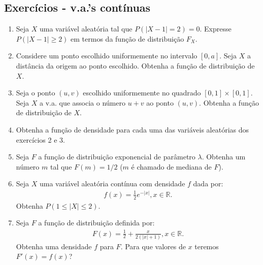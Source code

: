 \documentclass[../Notas.tex]{subfiles}
\begin{document}
\subsection{Exercícios - v.a.'s contínuas}

\begin{enumerate}
    \item Seja $X$ uma variável aleatória tal que $P(|X - 1| = 2) = 0$. Expresse $P(|X - 1| \geq 2)$ em termos da função de distribuição $F_X$.
    \item Considere um ponto escolhido uniformemente no intervalo $[0, a]$. Seja $X$ a distância da origem ao ponto escolhido. Obtenha a função de distribuição de $X$.
    \item Seja o ponto $(u, v)$ escolhido uniformemente no quadrado $[0, 1] \times [0, 1]$. Seja $X$ a v.a. que associa o número $u + v$ ao ponto $(u, v)$. Obtenha a função de distribuição de $X$.
    \item Obtenha a função de densidade para cada uma das variáveis aleatórias dos exercícios 2 e 3.
    \item Seja $F$ a função de distribuição exponencial de parâmetro $\lambda$. Obtenha um número $m$ tal que $F(m) = 1/2$ ($m$ é chamado de mediana de $F$).
    \item Seja $X$ uma variável aleatória contínua com densidade $f$ dada por:
    \begin{align*}
        f(x) = \frac{1}{2}e^{-|x|}, x\in\mathbb{R}.
    \end{align*}
    Obtenha $P(1 \leq |X| \leq 2)$.
    \item Seja $F$ a função de distribuição definida por:
    \begin{align*}
        F(x) = \frac{1}{2} + \frac{x}{2(|x| + 1)}, x\in\mathbb{R}.
    \end{align*}
    Obtenha uma densidade $f$ para $F$. Para que valores de $x$ teremos $F'(x) = f(x)$?
\end{enumerate}
\end{document}
